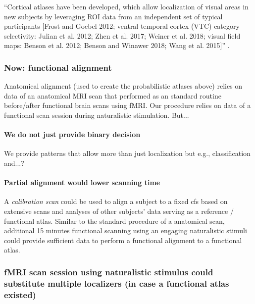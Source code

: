 ``Cortical atlases have been developed, which allow localization of visual areas
in new subjects by leveraging ROI data from an independent set of typical
participants [Frost and Goebel 2012; ventral temporal cortex (VTC) category
selectivity: Julian et al. 2012; Zhen et al.  2017; Weiner et al. 2018; visual
field maps: Benson et al. 2012; Benson and Winawer 2018; Wang et al. 2015]''
\citep{rosenke2021probabilistic}.




\subsubsection{Now: functional alignment}

%
Anatomical alignment (used to create the probabilistic atlases above) relies on
data of an anatomical MRI scan that performed as an standard routine
before/after functional brain scans using fMRI.
%
Our procedure relies on data of a functional scan session during naturalistic
stimulation.
%
But...


\paragraph{We do not just provide binary decision}


%
We provide patterns that allow more than just localization but e.g.,
classification and...?


\paragraph{Partial alignment would lower scanning time}
%
A \textit{calibration scan} could be used to align a subject to a fixed \ac{cfs}
based on extensive scans and analyses of other subjects' data serving as a
reference / functional atlas.
%
Similar to the standard procedure of a anatomical scan, additional 15 minutes
functional scanning using an engaging naturalistic stimuli  could provide
sufficient data to perform a functional alignment to a functional atlas.


\subsubsection{fMRI scan session using naturalistic stimulus could substitute
multiple localizers (in case a functional atlas existed)}

